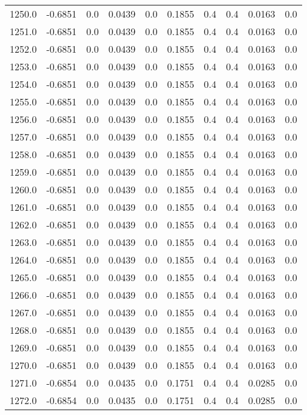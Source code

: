 \begin{longtable}{lrrrrrrrrr}
1250.0 & -0.6851 & 0.0 & 0.0439 & 0.0 & 0.1855 & 0.4 & 0.4 & 0.0163 & 0.0 \\
1251.0 & -0.6851 & 0.0 & 0.0439 & 0.0 & 0.1855 & 0.4 & 0.4 & 0.0163 & 0.0 \\
1252.0 & -0.6851 & 0.0 & 0.0439 & 0.0 & 0.1855 & 0.4 & 0.4 & 0.0163 & 0.0 \\
1253.0 & -0.6851 & 0.0 & 0.0439 & 0.0 & 0.1855 & 0.4 & 0.4 & 0.0163 & 0.0 \\
1254.0 & -0.6851 & 0.0 & 0.0439 & 0.0 & 0.1855 & 0.4 & 0.4 & 0.0163 & 0.0 \\
1255.0 & -0.6851 & 0.0 & 0.0439 & 0.0 & 0.1855 & 0.4 & 0.4 & 0.0163 & 0.0 \\
1256.0 & -0.6851 & 0.0 & 0.0439 & 0.0 & 0.1855 & 0.4 & 0.4 & 0.0163 & 0.0 \\
1257.0 & -0.6851 & 0.0 & 0.0439 & 0.0 & 0.1855 & 0.4 & 0.4 & 0.0163 & 0.0 \\
1258.0 & -0.6851 & 0.0 & 0.0439 & 0.0 & 0.1855 & 0.4 & 0.4 & 0.0163 & 0.0 \\
1259.0 & -0.6851 & 0.0 & 0.0439 & 0.0 & 0.1855 & 0.4 & 0.4 & 0.0163 & 0.0 \\
1260.0 & -0.6851 & 0.0 & 0.0439 & 0.0 & 0.1855 & 0.4 & 0.4 & 0.0163 & 0.0 \\
1261.0 & -0.6851 & 0.0 & 0.0439 & 0.0 & 0.1855 & 0.4 & 0.4 & 0.0163 & 0.0 \\
1262.0 & -0.6851 & 0.0 & 0.0439 & 0.0 & 0.1855 & 0.4 & 0.4 & 0.0163 & 0.0 \\
1263.0 & -0.6851 & 0.0 & 0.0439 & 0.0 & 0.1855 & 0.4 & 0.4 & 0.0163 & 0.0 \\
1264.0 & -0.6851 & 0.0 & 0.0439 & 0.0 & 0.1855 & 0.4 & 0.4 & 0.0163 & 0.0 \\
1265.0 & -0.6851 & 0.0 & 0.0439 & 0.0 & 0.1855 & 0.4 & 0.4 & 0.0163 & 0.0 \\
1266.0 & -0.6851 & 0.0 & 0.0439 & 0.0 & 0.1855 & 0.4 & 0.4 & 0.0163 & 0.0 \\
1267.0 & -0.6851 & 0.0 & 0.0439 & 0.0 & 0.1855 & 0.4 & 0.4 & 0.0163 & 0.0 \\
1268.0 & -0.6851 & 0.0 & 0.0439 & 0.0 & 0.1855 & 0.4 & 0.4 & 0.0163 & 0.0 \\
1269.0 & -0.6851 & 0.0 & 0.0439 & 0.0 & 0.1855 & 0.4 & 0.4 & 0.0163 & 0.0 \\
1270.0 & -0.6851 & 0.0 & 0.0439 & 0.0 & 0.1855 & 0.4 & 0.4 & 0.0163 & 0.0 \\
1271.0 & -0.6854 & 0.0 & 0.0435 & 0.0 & 0.1751 & 0.4 & 0.4 & 0.0285 & 0.0 \\
1272.0 & -0.6854 & 0.0 & 0.0435 & 0.0 & 0.1751 & 0.4 & 0.4 & 0.0285 & 0.0 \\

\end{longtable}
